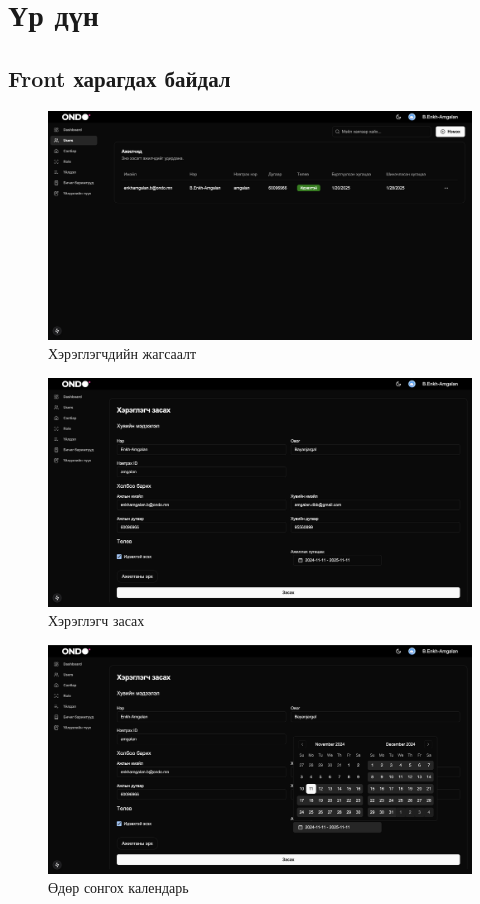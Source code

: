 \section{Үр дүн}
\subsection{Front харагдах байдал}

\begin{figure}
	\centering
	\includegraphics[width=15cm]{images/main.png}
	\caption{Хэрэглэгчдийн жагсаалт}
\end{figure}

\begin{figure}
	\centering
	\includegraphics[width=15cm]{images/front.png}
	\caption{Хэрэглэгч засах}
\end{figure}

\begin{figure}
	\centering
	\includegraphics[width=15cm]{images/calendar.png}
	\caption{Өдөр сонгох календарь}
\end{figure}

